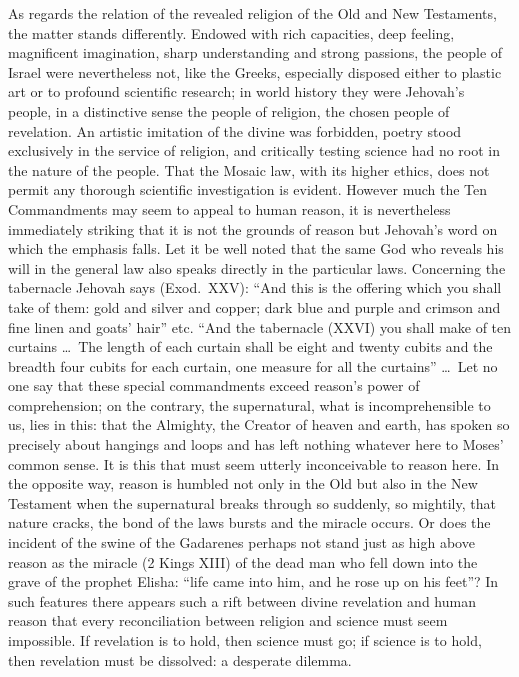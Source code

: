 \documentclass[12pt,a4paper]{article}
\newcommand{\opage}[1]{\marginnote{\footnotesize\textit{[#1]}}}
\begin{document}
As regards the relation of the revealed religion of the Old and New
Testaments, the matter stands differently. Endowed with rich
capacities, deep feeling, magnificent imagination, sharp understanding
and strong passions, the people of Israel were nevertheless not, like
the Greeks, especially disposed either to plastic art or to profound
scientific research; in world history they were Jehovah's people, in a
distinctive sense the people of religion, the chosen people of
revelation. An artistic imitation of the divine was forbidden, poetry
stood exclusively in the service of religion, and critically testing
science had no root in the nature of the people. That the Mosaic law,
with its higher ethics, does not permit any thorough scientific
investigation is evident. However much the Ten Commandments may seem to
appeal to human reason, it is nevertheless immediately striking that it
is not the grounds of reason but Jehovah's word on which the emphasis
falls. Let it be well noted that the same God who reveals his will in
the general law also speaks directly in the particular laws.
Concerning the tabernacle Jehovah says (Exod.\ XXV): ``And this is the
offering which you shall take of them: gold and silver and copper; dark
blue and purple and crimson and fine linen and goats' hair'' etc.
``And the tabernacle (XXVI) you shall make of ten curtains \ldots\ The
length of each curtain shall be eight and twenty cubits and the breadth
four cubits for each curtain, one measure for all the curtains''
\ldots\ Let no one say that these special commandments exceed reason's
power of comprehension; on the contrary, the supernatural, what is
incomprehensible to us, lies in this: that the Almighty, the Creator of
heaven and earth, has spoken so precisely about hangings and loops and
has left nothing whatever here to Moses' common sense. It is this that
must seem utterly inconceivable to reason here. In the opposite way,
reason is humbled not only in the Old but also in the New Testament
when the supernatural breaks through so suddenly, so mightily, that
nature cracks, the bond of the laws bursts and the miracle \opage{3}
occurs. Or does the incident of the swine of the Gadarenes perhaps not
stand just as high above reason as the miracle (2 Kings XIII) of the
dead man who fell down into the grave of the prophet Elisha: ``life
came into him, and he rose up on his feet''? In such features there
appears such a rift between divine revelation and human reason that
every reconciliation between religion and science must seem impossible.
If revelation is to hold, then science must go; if science is to hold,
then revelation must be dissolved: a desperate dilemma.
\end{document}

